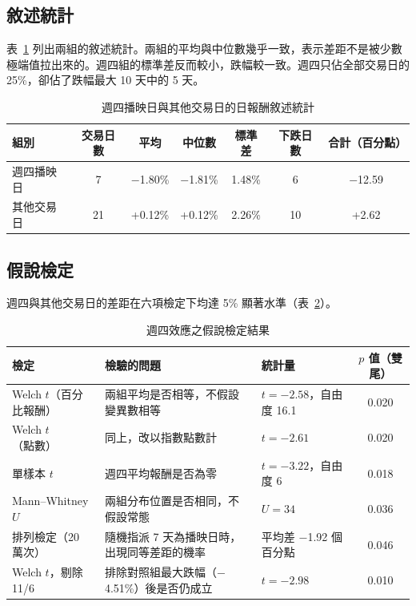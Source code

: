 \documentclass[11pt,a4paper]{article}
\newcommand{\m}{\ensuremath{-}}
\begin{document}
\subsection{敘述統計}

表~\ref{tab:desc} 列出兩組的敘述統計。兩組的平均與中位數幾乎一致，表示差距不是被少數極端值拉出來的。週四組的標準差反而較小，跌幅較一致。週四只佔全部交易日的 25\%，卻佔了跌幅最大 10 天中的 5 天。

\begin{table}[htbp]
\centering
\caption{週四播映日與其他交易日的日報酬敘述統計}
\label{tab:desc}
\begin{tabular}{lcccccc}
\toprule
組別 & 交易日數 & 平均 & 中位數 & 標準差 & 下跌日數 & 合計（百分點）\\
\midrule
週四播映日 & 7 & \m 1.80\% & \m 1.81\% & 1.48\% & 6 & \m 12.59\\
其他交易日 & 21 & +0.12\% & +0.12\% & 2.26\% & 10 & +2.62\\
\bottomrule
\end{tabular}
\end{table}

\subsection{假說檢定}

週四與其他交易日的差距在六項檢定下均達 5\% 顯著水準（表~\ref{tab:tests}）。

\begin{table}[htbp]
\centering
\caption{週四效應之假說檢定結果}
\label{tab:tests}
\small
\begin{tabular}{l>{\raggedright\arraybackslash}p{4.8cm}lc}
\toprule
檢定 & 檢驗的問題 & 統計量 & $p$ 值（雙尾）\\
\midrule
Welch $t$（百分比報酬） & 兩組平均是否相等，不假設變異數相等 & $t=-2.58$，自由度 16.1 & 0.020\\
Welch $t$（點數） & 同上，改以指數點數計 & $t=-2.61$ & 0.020\\
單樣本 $t$ & 週四平均報酬是否為零 & $t=-3.22$，自由度 6 & 0.018\\
Mann--Whitney $U$ & 兩組分布位置是否相同，不假設常態 & $U=34$ & 0.036\\
排列檢定（20 萬次） & 隨機指派 7 天為播映日時，出現同等差距的機率 & 平均差 \m 1.92 個百分點 & 0.046\\
Welch $t$，剔除 11/6 & 排除對照組最大跌幅（\m 4.51\%）後是否仍成立 & $t=-2.98$ & 0.010\\
\bottomrule
\end{tabular}
\end{table}
\end{document}
